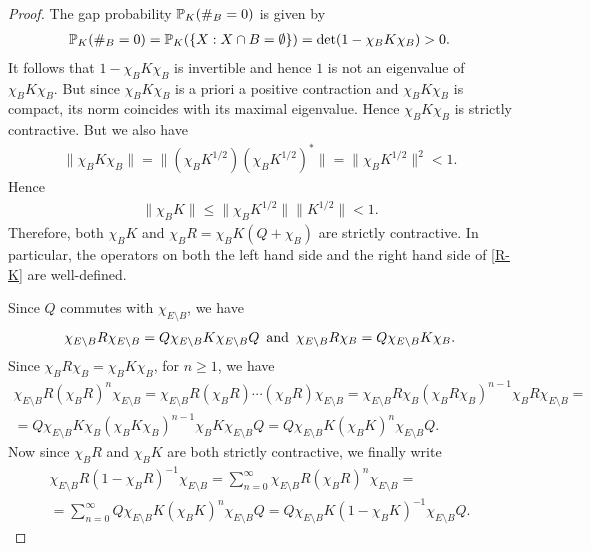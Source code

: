 \documentclass[12pt]{paper}
\numberwithin{theorem}{section}
\numberwithin{figure}{section}
\numberwithin{equation}{section}
\begin{document}
\begin{proof}
The gap probability $\mathbb{P}_K ( \#_B= 0)$ is given by
\begin{align}\label{gap-pb}
\mathbb{P}_K ( \#_B= 0) = \mathbb{P}_K(\{X: X\cap B = \emptyset\})  = \det (1 - \chi_B K \chi_B) >0.
\end{align}
It follows that $1 - \chi_B K \chi_B$ is invertible and hence $1$ is not an eigenvalue of $ \chi_B K \chi_B$. But since $\chi_B K \chi_B$ is a priori a positive contraction and $\chi_B K \chi_B$ is compact, its norm coincides with its maximal eigenvalue. Hence $\chi_B K \chi_B$ is strictly contractive. But we also have
\begin{align}\label{both-side-c}
\|  \chi_B K \chi_B \|  = \| ( \chi_B K^{1/2}  )  (  \chi_B K^{1/2})^* \| =  \|\chi_B K^{1/2}\|^2  < 1.
\end{align}
Hence
\begin{align}\label{one-side-c}
\| \chi_B K\| \le \| \chi_B K^{1/2}\| \|K^{1/2}\| < 1.
\end{align}
Therefore, both $\chi_B K$  and $ \chi_B R = \chi_BK(Q+\chi_B)$ are strictly contractive.  In particular, the operators on both the left hand side and the right hand side of \eqref{R-K} are well-defined.

Since $Q$ commutes with $\chi_{E\setminus B}$,  we have
\begin{align*}
\chi_{E\setminus B} R \chi_{E \setminus B}   = Q  \chi_{E\setminus B} K    \chi_{E\setminus B} Q \text{\, and \,} \chi_{E\setminus B} R \chi_B  = Q \chi_{E\setminus B} K \chi_B.
\end{align*}
Since $\chi_B R \chi_B = \chi_B K \chi_B$, for  $n\ge 1$, we have
\begin{multline}
 \chi_{E\setminus B} R (\chi_B R)^n  \chi_{E\setminus B}
=  \chi_{E\setminus B} R  (\chi_B R) \cdots (\chi_B R)  \chi_{E\setminus B}
 =  \chi_{E\setminus B} R \chi_B  (\chi_B R \chi_B)^{n-1} \chi_B R\chi_{E\setminus B}
 =\\=Q \chi_{E\setminus B} K  \chi_B  (\chi_B K \chi_B)^{n-1} \chi_B K \chi_{E\setminus B}  Q
 = Q \chi_{E\setminus B} K (\chi_BK)^n \chi_{E\setminus B} Q.
\end{multline}
Now since $\chi_B R$ and $\chi_B K$ are both strictly contractive,  we finally write
\begin{multline}
\chi_{E\setminus B}R ( 1 - \chi_B R)^{-1} \chi_{E\setminus B} =  \sum_{n=0}^\infty \chi_{E\setminus B} R (\chi_B R)^n \chi_{E\setminus B}=
\\= \sum_{n=0}^\infty  Q \chi_{E\setminus B} K (\chi_B K)^n \chi_{E\setminus B}Q =Q  \chi_{E\setminus B}K ( 1 - \chi_B K)^{-1} \chi_{E\setminus B} Q.
\end{multline}
\end{proof}
\end{document}
